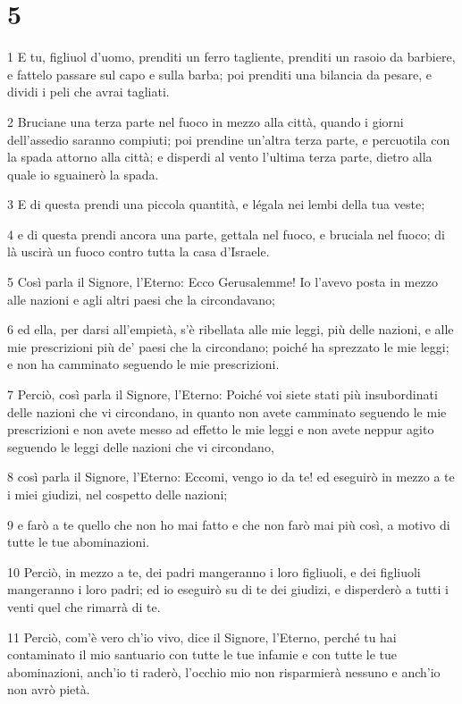 \chapter{5}

\par 1 E tu, figliuol d'uomo, prenditi un ferro tagliente, prenditi un rasoio da barbiere, e fattelo passare sul capo e sulla barba; poi prenditi una bilancia da pesare, e dividi i peli che avrai tagliati.
\par 2 Bruciane una terza parte nel fuoco in mezzo alla città, quando i giorni dell'assedio saranno compiuti; poi prendine un'altra terza parte, e percuotila con la spada attorno alla città; e disperdi al vento l'ultima terza parte, dietro alla quale io sguainerò la spada.
\par 3 E di questa prendi una piccola quantità, e légala nei lembi della tua veste;
\par 4 e di questa prendi ancora una parte, gettala nel fuoco, e bruciala nel fuoco; di là uscirà un fuoco contro tutta la casa d'Israele.
\par 5 Così parla il Signore, l'Eterno: Ecco Gerusalemme! Io l'avevo posta in mezzo alle nazioni e agli altri paesi che la circondavano;
\par 6 ed ella, per darsi all'empietà, s'è ribellata alle mie leggi, più delle nazioni, e alle mie prescrizioni più de' paesi che la circondano; poiché ha sprezzato le mie leggi; e non ha camminato seguendo le mie prescrizioni.
\par 7 Perciò, così parla il Signore, l'Eterno: Poiché voi siete stati più insubordinati delle nazioni che vi circondano, in quanto non avete camminato seguendo le mie prescrizioni e non avete messo ad effetto le mie leggi e non avete neppur agito seguendo le leggi delle nazioni che vi circondano,
\par 8 così parla il Signore, l'Eterno: Eccomi, vengo io da te! ed eseguirò in mezzo a te i miei giudizi, nel cospetto delle nazioni;
\par 9 e farò a te quello che non ho mai fatto e che non farò mai più così, a motivo di tutte le tue abominazioni.
\par 10 Perciò, in mezzo a te, dei padri mangeranno i loro figliuoli, e dei figliuoli mangeranno i loro padri; ed io eseguirò su di te dei giudizi, e disperderò a tutti i venti quel che rimarrà di te.
\par 11 Perciò, com'è vero ch'io vivo, dice il Signore, l'Eterno, perché tu hai contaminato il mio santuario con tutte le tue infamie e con tutte le tue abominazioni, anch'io ti raderò, l'occhio mio non risparmierà nessuno e anch'io non avrò pietà.
